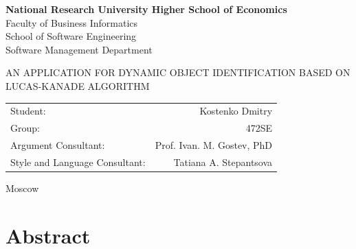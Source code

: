 \documentclass[12pt,a4paper,oneside,titlepage]{article}
\author{Kostenko}
\begin{document}
{
\thispagestyle{empty}
\newpage
\centering

\textbf{
National Research University Higher School of Economics\\
}
Faculty of Business Informatics\\
School of Software Engineering\\
Software Management Department

\vfill


\begin{large}
\MakeTextUppercase{
An Application for Dynamic Object Identification Based on Lucas-Kanade Algorithm
}
\end{large}


\vfill

\begin{tabular}{lr}
Student: & Kostenko Dmitry \\
Group: & 472SE \\
Argument Consultant: & Prof. Ivan. M. Gostev, PhD \\
Style and Language Consultant: & Tatiana A. Stepantsova
\end{tabular}

\vspace{\fill}

Moscow\\ \number\year
\clearpage
}

\section*{Abstract}
{
}





{
\newpage
\centering
\tableofcontents
}











\newpage
\end{document}
